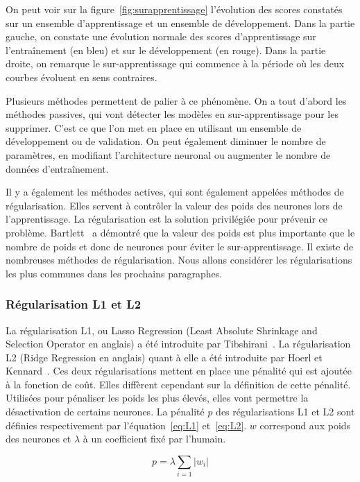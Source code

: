 On peut voir sur la figure~\ref{fig:surapprentissage} l'évolution des scores constatés sur un ensemble d'apprentissage et un ensemble de développement. Dans la partie gauche, on constate une évolution normale des scores d'apprentissage sur l’entraînement (en bleu) et sur le développement (en rouge). Dans la partie droite, on remarque le sur-apprentissage qui commence à la période où les deux courbes évoluent en sens contraires.

Plusieurs méthodes permettent de palier à ce phénomène. On a tout d'abord les méthodes passives, qui vont détecter les modèles en sur-apprentissage pour les supprimer. C'est ce que l'on met en place en utilisant un ensemble de développement ou de validation. On peut également diminuer le nombre de paramètres, en modifiant l'architecture neuronal ou augmenter le nombre de données d’entraînement.

Il y a également les méthodes actives, qui sont également appelées méthodes de régularisation. Elles servent à contrôler la valeur des poids des neurones lors de l'apprentissage. La régularisation est la solution privilégiée pour prévenir ce problème. Bartlett~\cite{Bartlett1997} a démontré que la valeur des poids est plus importante que le nombre de poids et donc de neurones pour éviter le sur-apprentissage. Il existe de nombreuses méthodes de régularisation. Nous allons considérer les régularisations les plus communes dans les prochains paragraphes.

\subsubsection{Régularisation L1 et L2}

La régularisation L1, ou Lasso Regression (Least Absolute Shrinkage and Selection Operator en anglais) a été introduite par Tibshirani~\cite{Tibshirani1996}. La régularisation L2 (Ridge Regression en anglais) quant à elle a été introduite par Hoerl et Kennard~\cite{Hoerl1970}. Ces deux régularisations mettent en place une pénalité qui est ajoutée à la fonction de coût. Elles diffèrent cependant sur la définition de cette pénalité. Utilisées pour pénaliser les poids les plus élevés, elles vont permettre la désactivation de certains neurones. La pénalité $p$ des régularisations L1 et L2 sont définies respectivement par l'équation~\ref{eq:L1} et~\ref{eq:L2}. $w$ correspond aux poids des neurones et $\lambda$ à un coefficient fixé par l'humain.

\begin{equation}
  p = \lambda\sum_{i=1}|w_i|
  \label{eq:L1}
\end{equation}


